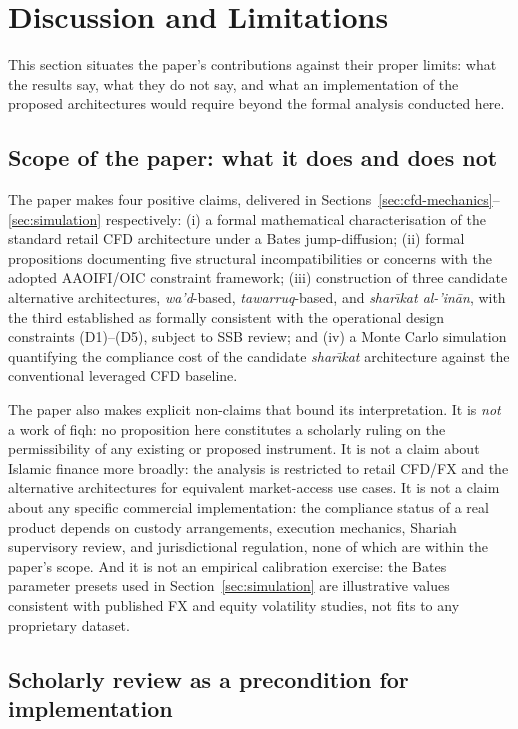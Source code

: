 \documentclass[preprint,12pt,authoryear]{elsarticle}
\theoremstyle{definition}
\begin{document}
\section{Discussion and Limitations}
\label{sec:discussion}

This section situates the paper's contributions against their
proper limits: what the results say, what they do not say, and
what an implementation of the proposed architectures would require
beyond the formal analysis conducted here.

\subsection{Scope of the paper: what it does and does not}
\label{sec:disc-scope}

The paper makes four positive claims, delivered in
Sections~\ref{sec:cfd-mechanics}--\ref{sec:simulation}
respectively: (i) a formal mathematical characterisation of the
standard retail CFD architecture under a Bates jump-diffusion;
(ii) formal propositions documenting five structural
incompatibilities or concerns with the adopted AAOIFI/OIC
constraint framework;
(iii) construction of three candidate alternative architectures,
\emph{wa'd}-based, \emph{tawarruq}-based, and
\emph{shar\={\i}kat al-'in\={a}n}, with the third established
as formally consistent with the operational design constraints
(D1)--(D5), subject to SSB review; and (iv) a Monte Carlo
simulation quantifying the compliance cost of the candidate
\emph{shar\={\i}kat} architecture against the conventional
leveraged CFD baseline.

The paper also makes explicit non-claims that bound its
interpretation. It is \emph{not} a work of fiqh: no proposition
here constitutes a scholarly ruling on the permissibility of any
existing or proposed instrument. It is not a claim about Islamic
finance more broadly: the analysis is restricted to retail
CFD/FX and the alternative architectures for equivalent
market-access use cases. It is not a claim about any specific
commercial implementation: the compliance status of a real
product depends on custody arrangements, execution mechanics,
Shariah supervisory review, and jurisdictional regulation,
none of which are within the paper's scope. And it is not an
empirical calibration exercise: the Bates parameter presets used
in Section~\ref{sec:simulation} are illustrative values
consistent with published FX and equity volatility studies, not
fits to any proprietary dataset.

\subsection{Scholarly review as a precondition for implementation}
\label{sec:disc-scholarly}
\end{document}
